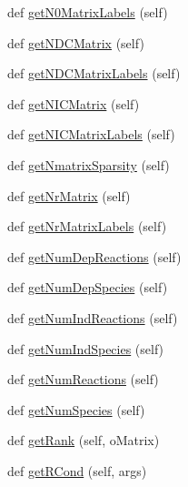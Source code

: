 \begin{DoxyCompactItemize}
\item 
def \hyperlink{classstructural_1_1_lib_structural_a7a02391368ca7a909fdcd49d07dfe40e}{get\+N0\+Matrix\+Labels} (self)
\item 
def \hyperlink{classstructural_1_1_lib_structural_abc5527ac936e398adf399458e2ac9b6f}{get\+N\+D\+C\+Matrix} (self)
\item 
def \hyperlink{classstructural_1_1_lib_structural_a189dad89f700b4f6382b54f7a7e47ded}{get\+N\+D\+C\+Matrix\+Labels} (self)
\item 
def \hyperlink{classstructural_1_1_lib_structural_a2633dfa6bdca94dcf00a6d17983bdaf5}{get\+N\+I\+C\+Matrix} (self)
\item 
def \hyperlink{classstructural_1_1_lib_structural_aa09256cf5851f8513730bc5b133ba49a}{get\+N\+I\+C\+Matrix\+Labels} (self)
\item 
def \hyperlink{classstructural_1_1_lib_structural_a8de47263e5db21152596c3c7d51917cb}{get\+Nmatrix\+Sparsity} (self)
\item 
def \hyperlink{classstructural_1_1_lib_structural_a956b2ab912b9b70a9aa30a3202e1f7ed}{get\+Nr\+Matrix} (self)
\item 
def \hyperlink{classstructural_1_1_lib_structural_ac9606ee240024e2699e0c47f21b9edf9}{get\+Nr\+Matrix\+Labels} (self)
\item 
def \hyperlink{classstructural_1_1_lib_structural_a0804a57e4f2891e815cd8f025dab1142}{get\+Num\+Dep\+Reactions} (self)
\item 
def \hyperlink{classstructural_1_1_lib_structural_a28d282cf5b56f099f6030d924103a518}{get\+Num\+Dep\+Species} (self)
\item 
def \hyperlink{classstructural_1_1_lib_structural_ac237318b1b94c7be10c62167551a4885}{get\+Num\+Ind\+Reactions} (self)
\item 
def \hyperlink{classstructural_1_1_lib_structural_a40530db5dcf0339dd9eeeb38598fb139}{get\+Num\+Ind\+Species} (self)
\item 
def \hyperlink{classstructural_1_1_lib_structural_af85ee60a7eb401bb9b0a50251c7e8645}{get\+Num\+Reactions} (self)
\item 
def \hyperlink{classstructural_1_1_lib_structural_a635ec3a306de16ad287075456b78adc8}{get\+Num\+Species} (self)
\item 
def \hyperlink{classstructural_1_1_lib_structural_a15b37dbf16994c517e83aaefa0bbe651}{get\+Rank} (self, o\+Matrix)
\item 
def \hyperlink{classstructural_1_1_lib_structural_a7be7b8110a5ae1badea83a34c334983d}{get\+R\+Cond} (self, args)

\end{DoxyCompactItemize}
